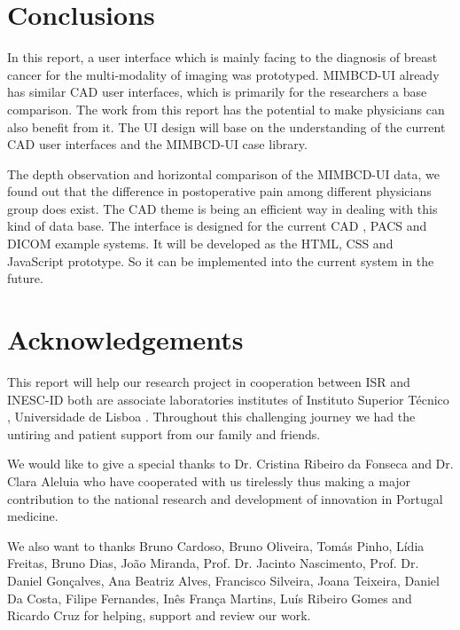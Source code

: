 \section{Conclusions}

In this report, a user interface which is mainly facing to the diagnosis of breast cancer for the multi-modality of imaging was prototyped. MIMBCD-UI already has similar CAD \cite{wikiCAD} user interfaces, which is primarily for the researchers a base comparison. The work from this report has the potential to make physicians can also benefit from it. The UI design will base on the understanding of the current CAD \cite{wikiCAD} user interfaces and the MIMBCD-UI case library.

The depth observation and horizontal comparison of the MIMBCD-UI data, we found out that the difference in postoperative pain among different physicians group does exist. The CAD \cite{wikiCAD} theme is being an efficient way in dealing with this kind of data base. The interface is designed for the current CAD \cite{wikiCAD}, PACS \cite{wikiPACS} and DICOM \cite{wikiDICOM} example systems. It will be developed as the HTML, CSS and JavaScript prototype. So it can be implemented into the current system in the future.

\clearpage

\section{Acknowledgements}

This report will help our research project in cooperation between ISR \cite{isr} and INESC-ID \cite{inescid} both are associate laboratories institutes of Instituto Superior T\'{e}cnico \cite{ist}, Universidade de Lisboa \cite{ul}. Throughout this challenging journey we had the untiring and patient support from our family and friends.

We would like to give a special thanks to Dr. Cristina Ribeiro da Fonseca and Dr. Clara Aleluia who have cooperated with us tirelessly thus making a major contribution to the national research and development of innovation in Portugal medicine.

We also want to thanks Bruno Cardoso, Bruno Oliveira, Tom\'{a}s Pinho, L\'{i}dia Freitas, Bruno Dias, Jo\~{a}o Miranda, Prof. Dr. Jacinto Nascimento, Prof. Dr. Daniel Gon\c{c}alves, Ana Beatriz Alves, Francisco Silveira, Joana Teixeira, Daniel Da Costa, Filipe Fernandes, In\^{e}s Fran\c{c}a Martins, Lu\'{i}s Ribeiro Gomes and Ricardo Cruz for helping, support and review our work.

\clearpage

\printbibliography


